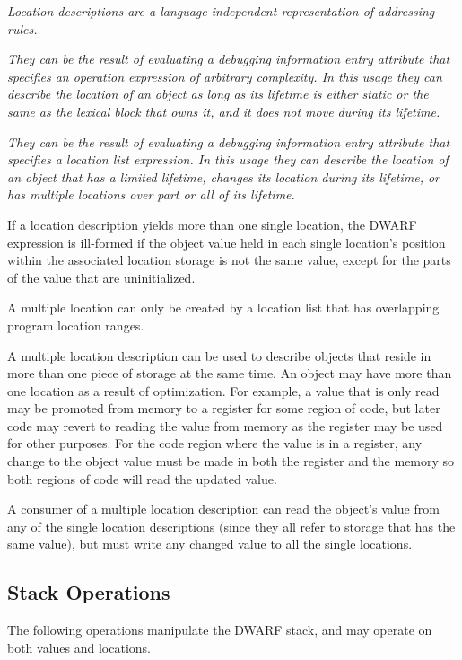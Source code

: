 \textit{Location descriptions are a language independent representation of
addressing rules.}

\textit{They can be the result of evaluating a debugging information entry
attribute that specifies an operation expression of arbitrary
complexity. In this usage they can describe the location of an object
as long as its lifetime is either static or the same as the lexical
block that owns it, and it does not move during its lifetime.}

\textit{They can be the result of evaluating a debugging information entry
attribute that specifies a location list expression. In this usage they
can describe the location of an object that has a limited lifetime,
changes its location during its lifetime, or has multiple locations over
part or all of its lifetime.}

If a location description yields more than one single location,
the DWARF expression is ill-formed if the object value held in each
single location’s position within the associated location
storage is not the same value, except for the parts of the value that
are uninitialized.

A multiple location can only be created by a location list that has
overlapping program location ranges.

A multiple location description can be used to describe objects that
reside in more than one piece of storage at the same time. An object
may have more than one location as a result of optimization. For
example, a value that is only read may be promoted from memory to a
register for some region of code, but later code may revert to reading
the value from memory as the register may be used for other purposes.
For the code region where the value is in a register, any change to
the object value must be made in both the register and the memory so
both regions of code will read the updated value.

A consumer of a multiple location description can read the object’s
value from any of the single location descriptions (since they all
refer to storage that has the same value), but must write any changed
value to all the single locations.

\subsection{Stack Operations}
\label{chap:stackoperations}
The following 
operations manipulate the DWARF stack, and may operate on both values
and locations.

